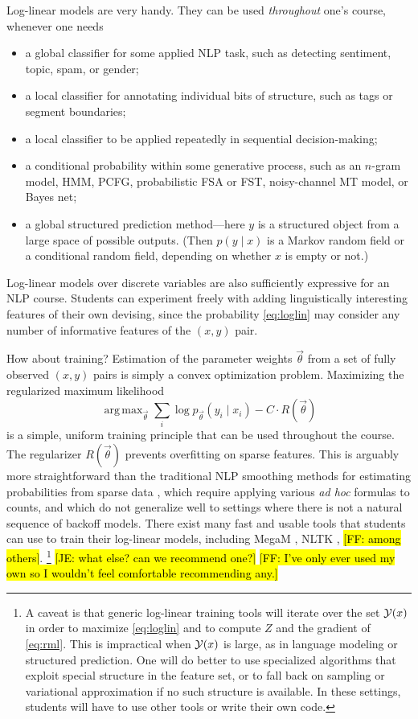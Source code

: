 \documentclass[11pt,letterpaper]{article}
\DeclareMathOperator*{\argmax}{arg\,max}
\newcommand{\Note}[1]{}
\renewcommand{\Note}[1]{\hl{[#1]}}
\newcommand{\NoteSigned}[3]{{\sethlcolor{#2}\Note{#1: #3}}}
\newcommand{\NoteFF}[1]{\NoteSigned{FF}{LightBlue}{#1}}
\newcommand{\NoteJE}[1]{\NoteSigned{JE}{LightGreen}{#1}}
\begin{document}
Log-linear models are very handy.  They can be used {\em throughout} 
one's course, whenever one needs 
\begin{itemize}
\item a global classifier for some applied NLP task, such as detecting
  sentiment, topic, spam, or gender;
\item a local classifier for annotating individual bits of structure, 
  such as tags or segment boundaries;
\item a local classifier to be applied repeatedly in sequential decision-making;
\item a conditional probability within some generative process, such
  as an $n$-gram model, HMM, PCFG, probabilistic FSA or FST, noisy-channel MT model,
  or Bayes net;
\item a global structured prediction method---here $y$ is a structured
  object from a large space of possible outputs.  (Then $p(y \mid x)$ is a
  Markov random field or a conditional random field, depending on whether 
  $x$ is empty or not.)
\end{itemize}  

Log-linear models over discrete variables are also sufficiently
expressive for an NLP course.  Students can experiment freely with
adding linguistically interesting features of their own devising,
since the probability \eqref{eq:loglin} may consider any number of
informative features of the $(x,y)$ pair.

How about training?  Estimation of the parameter weights
$\vec{\theta}$ from a set of fully observed $(x,y)$ pairs is simply a
convex optimization problem.  Maximizing the regularized maximum
likelihood
\begin{equation}\label{eq:rml}
  \argmax_{\vec{\theta}} \sum_i \log p_{\vec{\theta}}(y_i \mid x_i) - C\cdot R\left(\vec{\theta}\right)
\end{equation}
is a simple, uniform training principle that can be used throughout
the course.  The regularizer $R\left(\vec{\theta}\right)$
prevents overfitting on sparse features.
This is arguably more straightforward than the traditional NLP
smoothing methods for estimating probabilities from sparse data
\cite{chen-goodman-1996}, which require applying various {\em ad hoc}
formulas to counts, and which do not generalize well to settings where
there is not a natural sequence of backoff models.  There exist many
fast and usable tools that students can use to train their log-linear
models, including MegaM \cite{daume04cg-bfgs}, NLTK \cite{bird2009natural}, 
\NoteFF{among others}.
\footnote{\label{fn:bigY}A caveat is that generic
  log-linear training tools will iterate over the set ${\cal
    Y}(x)$ in order to maximize
  \eqref{eq:loglin} and to compute $Z$ and the gradient of
  \eqref{eq:rml}.  This is impractical when ${\cal Y}(x)$ is large, as in
  language modeling or structured prediction.  One will do better to
  use specialized algorithms that exploit special structure in the
  feature set, or to fall back on sampling or variational
  approximation if no such structure is available.  In these settings,
  students will have to use other tools or write their own code.}
\NoteJE{what else?  can we recommend one?}
\NoteFF{I've only ever used my own so I wouldn't feel comfortable
recommending any.}
\end{document}
